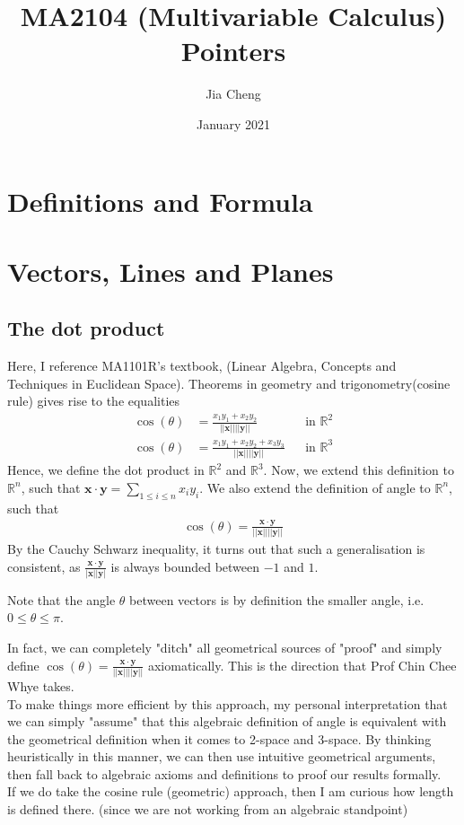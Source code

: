 \documentclass{article}
\title{MA2104 (Multivariable Calculus) Pointers}
\author{Jia Cheng}
\date{January 2021}
\begin{document}
\maketitle

\section{Definitions and Formula}


\section{Vectors, Lines and Planes}
\subsection{The dot product}
Here, I reference MA1101R's textbook, (Linear Algebra, Concepts and Techniques in Euclidean Space).
Theorems in geometry and trigonometry(cosine rule) gives rise to the equalities
\begin{align*}
	\cos(\theta) &= \frac{x_1y_1+x_2y_2}{||\mathbf{x}||||\mathbf{y}||} &&\text{in } \mathbb{R}^2\\
	\cos(\theta) &= \frac{x_1y_1+x_2y_2+x_3y_3}{||\mathbf{x}||||\mathbf{y}||} &&\text{in } \mathbb{R}^3
\end{align*} 
Hence, we define the dot product in $\mathbb{R}^2$ and $\mathbb{R}^3$. Now, we extend this definition to $\mathbb{R}^n$, such that $\mathbf{x}\cdot \mathbf{y} = \sum_{1\leq i\leq n}x_iy_i$. We also extend the definition of angle to $\mathbb{R}^n$, such that 
\begin{align*}
	\cos(\theta) = \frac{\mathbf{x}\cdot \mathbf{y}}{||\mathbf{x}||||\mathbf{y}||}
\end{align*}
By the Cauchy Schwarz inequality, it turns out that such a generalisation is consistent, as $\frac{\mathbf{x}\cdot \mathbf{y}}{|\mathbf{x}||\mathbf{y}|}$ is always bounded between $-1$ and $1$.

Note that the angle $\theta$ between vectors is by definition the smaller angle, i.e. $0\leq \theta \leq \pi$.

In fact, we can completely "ditch" all geometrical sources of "proof" and simply define $\cos(\theta) = \frac{\mathbf{x}\cdot \mathbf{y}}{||\mathbf{x}||||\mathbf{y}||}$ axiomatically. This is the direction that Prof Chin Chee Whye takes.\\
To make things more efficient by this approach, my personal interpretation that we can simply "assume" that this algebraic definition of angle is equivalent with the geometrical definition when it comes to 2-space and 3-space. By thinking heuristically in this manner, we can then use intuitive geometrical arguments, then fall back to algebraic axioms and definitions to proof our results formally.\\
If we do take the cosine rule (geometric) approach, then I am curious how length is defined there. (since we are not working from an algebraic standpoint)
\end{document}

